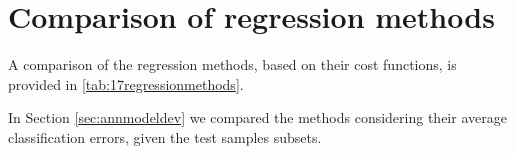 \section{Comparison of regression methods}
\label{sec:comparisonofregressionmethods}

A comparison of the regression methods, based on their cost functions, is
provided in \ref{tab:17regressionmethods}.

In Section \ref{sec:annmodeldev} we compared the methods considering their
average classification errors, given the test samples subsets.
